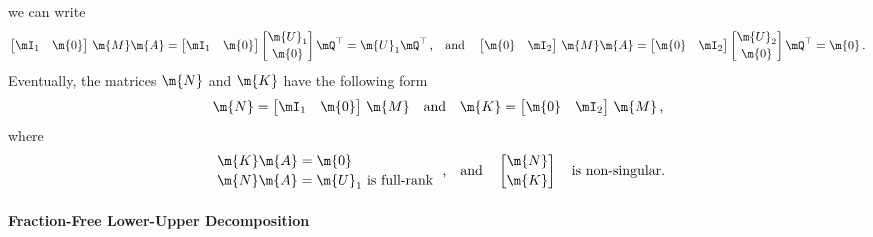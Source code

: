 %
we can write
%
\begin{equation*}
  \begin{bmatrix} \mI_1 & \m{0} \end{bmatrix} \, \m{M}\m{A} =
  \begin{bmatrix} \mI_1 & \m{0} \end{bmatrix}
  \begin{bmatrix} \m{U}_1 \\[0.2em] \m{0} \end{bmatrix} \mQ^\top = \m{U}_1 \mQ^\top \, \text{,}
  \quad \text{and} \quad
  \begin{bmatrix} \m{0} & \mI_2 \end{bmatrix} \, \m{M}\m{A} =
  \begin{bmatrix} \m{0} & \mI_2 \end{bmatrix}
  \begin{bmatrix} \m{U}_2 \\[0.2em] \m{0} \end{bmatrix} \mQ^\top = \m{0} \, \text{.}
\end{equation*}
%
Eventually, the matrices $\m{N}$ and $\m{K}$ have the following form
%
\begin{equation*}
  \m{N} = \begin{bmatrix} \mI_1 & \m{0} \end{bmatrix} \, \m{M}
  \quad \text{and} \quad
  \m{K} = \begin{bmatrix} \m{0} & \mI_2 \end{bmatrix} \, \m{M} \, \text{,}
\end{equation*}
%
where
%
\begin{equation*}
  \begin{array}{l}
      \m{K}\m{A} = \m{0} \\[0.2em]
      \m{N}\m{A} = \m{U}_1 ~ \text{is full-rank}
  \end{array} \, \text{,}
  \quad \text{and} \quad
  \begin{bmatrix} \m{N} \\[0.2em] \m{K} \end{bmatrix} \quad \text{is non-singular.}
\end{equation*}

\paragraph{Fraction-Free Lower-Upper Decomposition}

